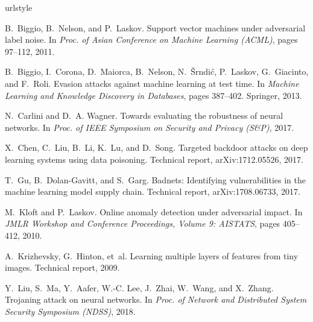 \documentclass[conference]{IEEEtran}
\begin{document}
\footnotesize{

\balance

\begin{thebibliography}{21}
	\providecommand{\natexlab}[1]{#1}
	\providecommand{\url}[1]{\texttt{#1}}
	\expandafter\ifx\csname urlstyle\endcsname\relax
	\providecommand{\doi}[1]{doi: #1}\else
	\providecommand{\doi}{doi: \begingroup \urlstyle{rm}\Url}\fi
	
	B.~Biggio, B.~Nelson, and P.~Laskov.
	\newblock Support vector machines under adversarial label noise.
	\newblock In \emph{Proc. of Asian Conference on Machine Learning 
	{(ACML)}},
	pages 97--112, 2011.
	
	B.~Biggio, I.~Corona, D.~Maiorca, B.~Nelson, N.~{\v{S}}rndi{\'{c}}, 
	P.~Laskov,
	G.~Giacinto, and F.~Roli.
	\newblock Evasion attacks against machine learning at test time.
	\newblock In \emph{Machine Learning and Knowledge Discovery in 
	Databases},
	pages 387--402. Springer, 2013.
	
	N.~Carlini and D.~A. Wagner.
	\newblock Towards evaluating the robustness of neural networks.
	\newblock In \emph{Proc. of {IEEE} Symposium on Security and 
	Privacy ({S\&P})},
	2017.
	
	X.~Chen, C.~Liu, B.~Li, K.~Lu, and D.~Song.
	\newblock Targeted backdoor attacks on deep learning systems using 
	data
	poisoning.
	\newblock Technical report, arXiv:1712.05526, 2017.
	
	T.~Gu, B.~Dolan{-}Gavitt, and S.~Garg.
	\newblock Badnets: Identifying vulnerabilities in the machine 
	learning model
	supply chain.
	\newblock Technical report, arXiv:1708.06733, 2017.
	
	M.~Kloft and P.~Laskov.
	\newblock Online anomaly detection under adversarial impact.
	\newblock In \emph{JMLR Workshop and Conference Proceedings, Volume 
	9:
		AISTATS}, pages 405--412, 2010.
	
	A.~Krizhevsky, G.~Hinton, et~al.
	\newblock Learning multiple layers of features from tiny images.
	\newblock Technical report, 2009.
	
	Y.~Liu, S.~Ma, Y.~Aafer, W.-C. Lee, J.~Zhai, W.~Wang, and X.~Zhang.
	\newblock Trojaning attack on neural networks.
	\newblock In \emph{Proc. of Network and Distributed System Security 
	Symposium
		({NDSS})}, 2018.
	

\end{thebibliography}}
\end{document}
